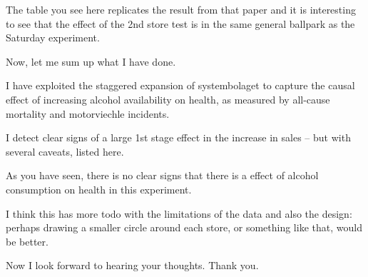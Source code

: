 \documentclass[12pt]{article}
\begin{document}
The table you see here replicates the result from that paper and it is interesting to see that the effect of the 2nd store test is in the same general ballpark as the Saturday experiment.

Now, let me sum up what I have done.

I have exploited the staggered expansion of systembolaget to capture the causal effect of increasing alcohol availability on health, as measured by all-cause mortality and motorviechle incidents. 

I detect clear signs of a large 1st stage effect in the increase in sales -- but with several caveats, listed here.

As you have seen, there is no clear signs that there is a effect of alcohol consumption on health in this experiment. 

I think this has more todo with the limitations of the data and also the design: perhaps drawing a smaller circle around each store, or something like that, would be better.

Now I look forward to hearing your thoughts. Thank you.
 
\end{document}
